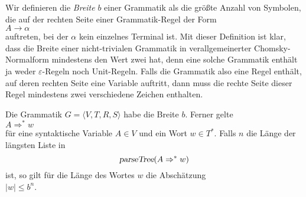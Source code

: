 Wir definieren die \emph{Breite} $b$ einer Grammatik als die gr\"o{\ss}te Anzahl von Symbolen, die 
auf der rechten Seite einer Grammatik-Regel der Form
\\[0.2cm]
\hspace*{1.3cm}
$A \rightarrow \alpha$
\\[0.2cm]
auftreten, bei der $\alpha$ kein einzelnes Terminal ist.  Mit dieser Definition ist klar, dass die Breite
einer nicht-trivialen Grammatik in verallgemeinerter Chomsky-Normalform mindestens den Wert zwei hat,
denn eine solche Grammatik enth\"alt ja weder $\varepsilon$-Regeln noch Unit-Regeln.  Falls die Grammatik
also eine Regel enth\"alt, auf deren rechten Seite eine Variable auftritt, dann muss die rechte Seite
dieser Regel mindestens zwei verschiedene Zeichen enthalten.


\begin{Lemma} \label{lemma:length}
  Die Grammatik $G = \langle V, T, R, S \rangle$ habe die Breite $b$.  Ferner gelte
  \\[0.2cm]
  \hspace*{1.3cm}
  $A \Rightarrow^* w$
  \\[0.2cm]
  f\"ur eine syntaktische Variable $A \in V$ und ein Wort $w \in T^*$.  Falls $n$ die L\"ange der l\"angsten Liste in
  \[ \textsl{parseTree}(A \Rightarrow^* w) \]
  ist, so gilt f\"ur die L\"ange des Wortes $w$ die Absch\"atzung
  \\[0.2cm]
  \hspace*{1.3cm}
  $|w| \leq b^{n}$.  
\end{Lemma}

